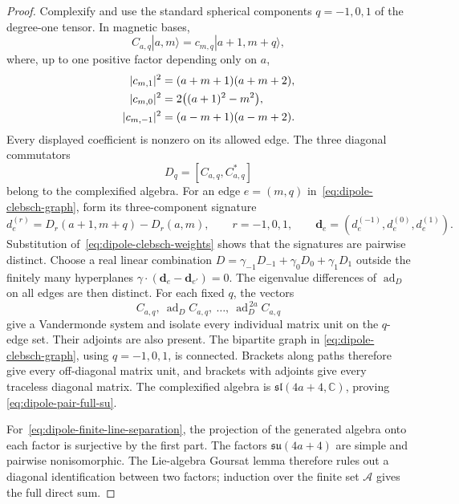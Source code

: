 \documentclass[11pt]{article}
\theoremstyle{remark}
\begin{document}
\begin{proof}
Complexify and use the standard spherical components
$q=-1,0,1$ of the degree-one tensor.  In magnetic bases,
\begin{equation}
 C_{a,q}|a,m\rangle=c_{m,q}|a+1,m+q\rangle,
 \label{eq:dipole-clebsch-graph}
\end{equation}
where, up to one positive factor depending only on $a$,
\begin{align}
 |c_{m,1}|^2&=(a+m+1)(a+m+2),\notag\\
 |c_{m,0}|^2&=2\bigl((a+1)^2-m^2\bigr),                 \label{eq:dipole-clebsch-weights}\\
 |c_{m,-1}|^2&=(a-m+1)(a-m+2).\notag
\end{align}
Every displayed coefficient is nonzero on its allowed edge.  The three
diagonal commutators
\[
 D_q=[C_{a,q},C_{a,q}^\ast]
\]
belong to the complexified algebra.  For an edge
$e=(m,q)$ in~\eqref{eq:dipole-clebsch-graph}, form its three-component
signature
\[
 d_e^{(r)}
 =D_r(a+1,m+q)-D_r(a,m),
 \qquad r=-1,0,1,
 \qquad
 \mathbf d_e=(d_e^{(-1)},d_e^{(0)},d_e^{(1)}).
\]
Substitution of~\eqref{eq:dipole-clebsch-weights} shows that the signatures
are pairwise distinct.  Choose a real linear combination
$D=\gamma_{-1}D_{-1}+\gamma_0D_0+\gamma_1D_1$ outside the finitely many
hyperplanes
$\gamma\cdot(\mathbf d_e-\mathbf d_{e'})=0$.  The eigenvalue differences of
$\operatorname{ad}_D$ on all edges are then distinct.
For each fixed $q$, the vectors
\[
 C_{a,q},\ \operatorname{ad}_D C_{a,q},\
 \ldots,\
 \operatorname{ad}_D^{\,2a}C_{a,q}
\]
give a Vandermonde system and isolate every individual matrix unit on the
$q$-edge set.  Their adjoints are also present.  The bipartite graph in
\eqref{eq:dipole-clebsch-graph}, using $q=-1,0,1$, is connected.  Brackets
along paths therefore give every off-diagonal matrix unit, and brackets with
adjoints give every traceless diagonal matrix.  The complexified algebra is
$\mathfrak{sl}(4a+4,\mathbb C)$, proving
\eqref{eq:dipole-pair-full-su}.

For~\eqref{eq:dipole-finite-line-separation}, the projection of the generated
algebra onto each factor is surjective by the first part.  The factors
$\mathfrak{su}(4a+4)$ are simple and pairwise nonisomorphic.  The Lie-algebra
Goursat lemma therefore rules out a diagonal identification between two
factors; induction over the finite set $\mathcal A$ gives the full direct
sum.
\end{proof}
\end{document}
